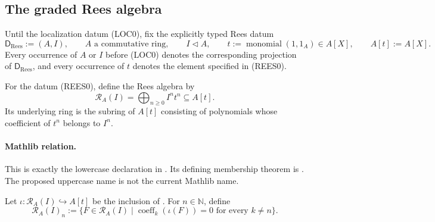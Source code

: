 \subsection{The graded Rees algebra}

Until the localization datum (LOC0), fix the explicitly typed Rees datum
\[
  \mathsf D_{\mathrm{Rees}}:=(A,I),\qquad
  A\text{ a commutative ring},\qquad I\triangleleft A,\qquad
  t:=\operatorname{monomial}(1,1_A)\in A[X],\qquad A[t]:=A[X].      \tag{REES0}
\]
Every occurrence of $A$ or $I$ before (LOC0) denotes the corresponding
projection of $\mathsf D_{\mathrm{Rees}}$, and every occurrence of $t$ denotes
the element specified in (REES0).

\begin{definition}
  \label{def:nagata-rees-algebra}
  \leanok

  For the datum (REES0), define the Rees algebra by
  \[
    \mathcal R_A(I)=\bigoplus_{n\geq 0}I^nt^n\subseteq A[t].
  \]
  Its underlying ring is the subring of $A[t]$ consisting of polynomials whose
  coefficient of $t^n$ belongs to $I^n$.

  \paragraph{Mathlib relation.}
  This is exactly the lowercase declaration
  \texttt{} in
  \texttt{}.  Its defining
  membership theorem is \texttt{}.  The
  proposed uppercase name \texttt{} is not the
  current Mathlib name.
\end{definition}

\begin{definition}
  \label{def:nagata-rees-piece}
  \leanok

  Let $\iota\colon\mathcal R_A(I)\hookrightarrow A[t]$ be the inclusion of
  .  For $n\in\mathbb N$, define
  \[
    \mathcal R_A(I)_n:=
    \{F\in\mathcal R_A(I)\mid
      \operatorname{coeff}_k(\iota(F))=0\text{ for every }k\ne n\}.
  \]
\end{definition}

